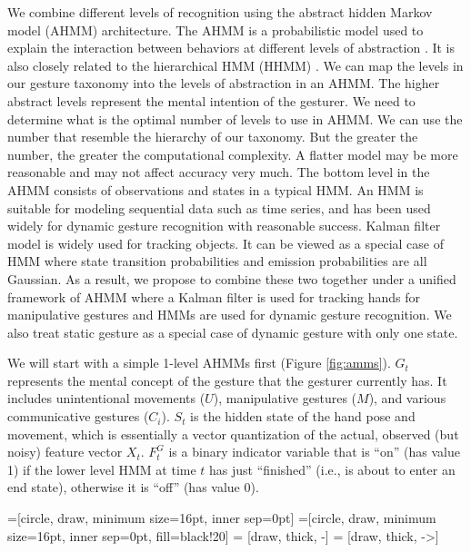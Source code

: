 We combine different levels of recognition using the abstract hidden Markov
model (AHMM) architecture. The AHMM is a probabilistic model used to explain the
interaction between behaviors at different levels of abstraction \cite{johns05}.
It is also closely related to the hierarchical HMM (HHMM) \cite{fine98}. We can
map the levels in our gesture taxonomy into the levels of abstraction in an
AHMM. The higher abstract levels represent the mental intention of the gesturer.
We need to determine what is the optimal number of levels to use in AHMM. We can
use the number that resemble the hierarchy of our taxonomy. But the greater the 
number, the greater the computational complexity. A flatter model may be more 
reasonable and may not affect accuracy very much. The bottom level in the AHMM 
consists of observations and states in a typical HMM. An HMM is suitable for 
modeling sequential data such as time series, and has been used widely for 
dynamic gesture recognition with reasonable success. Kalman filter model is 
widely used for tracking objects. It can be viewed as a special case of HMM
where state transition probabilities and emission probabilities are all Gaussian. As 
a result, we propose to combine these two together under a unified framework of 
AHMM where a Kalman filter is used for tracking hands for manipulative gestures 
and HMMs are used for dynamic gesture recognition. We also treat static gesture 
as a special case of dynamic gesture with only one state.

We will start with a simple 1-level AHMMs \cite{murphy02} first (Figure
\ref{fig:amms}). $G_t$ represents the mental concept of the gesture that the
gesturer currently has. It includes unintentional movements ($U$), manipulative
gestures ($M$), and various communicative gestures ($C_i$). $S_t$ is the hidden
state of the hand pose and movement, which is essentially a vector quantization of the actual, observed 
(but noisy) feature vector $X_t$. $F_t^G$ is a binary indicator variable that is
``on'' (has value 1) if the lower level HMM at time $t$ has just ``finished''
(i.e., is about to enter an end state), otherwise it is ``off'' (has value 0).

=[circle, draw, minimum size=16pt, inner sep=0pt]
=[circle, draw, minimum size=16pt, inner sep=0pt,
							 fill=black!20] 
 = [draw, thick, -]
 = [draw, thick, ->]

